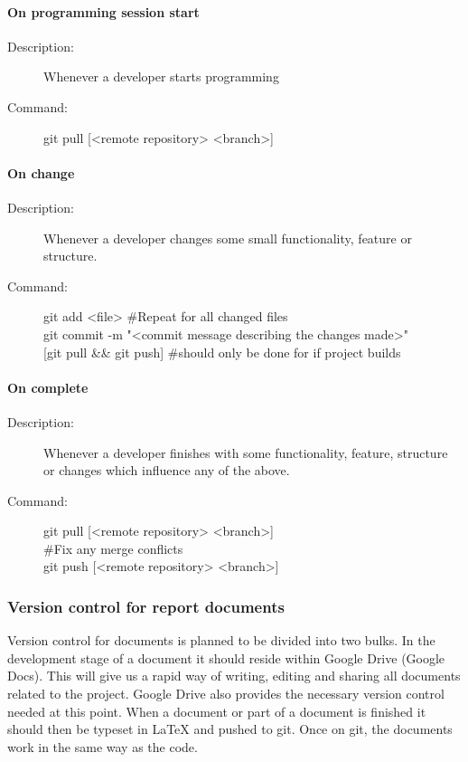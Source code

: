 \paragraph{On programming session start}
\begin{description}
\item[Description:] Whenever a developer starts programming
\item[Command:] git pull [<remote repository> <branch>]
\end{description}

\paragraph{On change}
\begin{description}
\item[Description:] Whenever a developer changes some small functionality, feature or structure.
\item[Command:] git add <file> \#Repeat for all changed files \\
\hspace*{3em} git commit -m "<commit message describing the changes made>"\\
\hspace*{3em} [git pull \&\& git push] \#should only be done for if project builds
\end{description}

\paragraph{On complete}
\begin{description}
\item[Description:]  Whenever a developer finishes with some functionality, feature,  structure or changes 
\hspace*{4em}which influence any of the above.
\item[Command:]  git pull [<remote repository> <branch>] \\ 
\hspace*{3em} \#Fix any merge conflicts \\
\hspace*{3.5em}git push [<remote repository> <branch>]
\end{description}

\subsubsection{Version control for report documents}
Version control for documents is planned to be divided into two bulks. In the development stage of a document it should reside within Google Drive (Google Docs). This will give us a rapid way of writing, editing and sharing all documents related to the project. Google Drive also provides the necessary version control needed at this point. When a document or part of a document is finished it should then be typeset in LaTeX and pushed to \gls{git}. Once on \gls{git}, the documents work in the same way as the code.  


